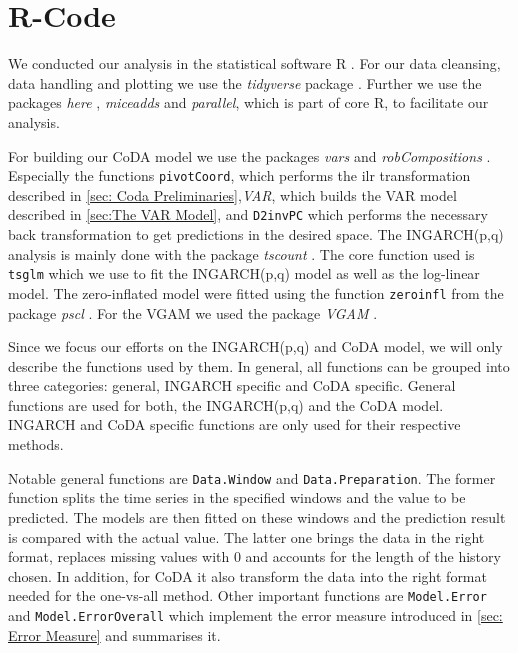 \section{R-Code}
\label{sec:R-Code}

We conducted our analysis in the statistical software R \cite{R:2022}. For our data cleansing, data handling and plotting we use the \textit{tidyverse} package \cite{Tidyverse:2019}. Further we use the packages \textit{here} \cite{here:2020}, \textit{miceadds} \cite{Miceadds:2023} and \textit{parallel}, which is part of core R, to facilitate our analysis.  

For building our CoDA model we use the packages \textit{vars} \cite{VAR:2008,CoDAR2:2008} and \textit{robCompositions} \cite{RobComp:2011,CoDAR4:2018}. Especially the functions \texttt{pivotCoord}, which performs the ilr transformation described in \ref{sec: Coda Preliminaries},\textit{VAR}, which builds the VAR model described in \ref{sec:The VAR Model}, and \texttt{D2invPC} which performs the necessary back transformation to get predictions in the desired space. The INGARCH(p,q) analysis is mainly done with the package \textit{tscount} \cite{Tscount:2017,Tscount:2020}. The core function used is \texttt{tsglm} which we use to fit the INGARCH(p,q) model as well as the log-linear model. The zero-inflated model were fitted using the function \texttt{zeroinfl} from the package \textit{pscl} \cite{Pscl:2008}. For the VGAM we used the package \textit{VGAM} \cite{RVGAM:2010}. 

Since we focus our efforts on the INGARCH(p,q) and CoDA model, we will only describe the functions used by them. In general, all functions can be grouped into three categories: general, INGARCH specific and CoDA specific. General functions are used for both, the INGARCH(p,q) and the CoDA model. INGARCH and CoDA specific functions are only used for their respective methods. 

Notable general functions are \texttt{Data.Window} and \texttt{Data.Preparation}. The former function splits the time series in the specified windows and the value to be predicted. The models are then fitted on these windows and the prediction result is compared with the actual value. The latter one brings the data in the right format, replaces missing values with 0 and accounts for the length of the history chosen. In addition, for CoDA it also transform the data into the right format needed for the one-vs-all method. Other important functions are \texttt{Model.Error} and \texttt{Model.ErrorOverall} which implement the error measure introduced in \ref{sec: Error Measure} and summarises it. 

